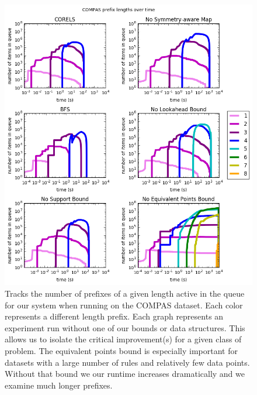 \begin{figure}
\begin{center}
\includegraphics[width=1.1\textwidth]{figs/compas_prefixes.png}
\end{center}
\vspace{-1cm}
\caption{Tracks the number of prefixes of a given length active in the queue for our system when running on the COMPAS dataset.
Each color represents a different length prefix.
Each graph represents an experiment run without one of our bounds or data structures.
This allows us to isolate the critical improvement(s) for a given class of problem.
The equivalent points bound is especially important for datasets with a large number of rules and relatively few data points.
Without that bound we our runtime increases dramatically and we examine much longer prefixes.
}
\label{fig:compas-prefixes}
\end{figure}

